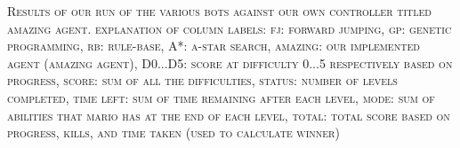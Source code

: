 \documentclass[12pt]{article}
\begin{document}
\begin{center}
\begin{table}[h]
\caption*{\footnotesize Controller Scores}
\end{table}

\vspace{-3ex}
\textsc{\scriptsize Results of our run of the various bots against our own controller titled amazing agent. explanation 
of column labels: fj: forward jumping, gp: genetic programming, rb: rule-base, A*: a-star search, amazing: our 
implemented agent (amazing agent), D0...D5: score at difficulty 0...5 respectively based on progress, score: sum of 
all the difficulties, status: number of levels completed, time left: sum of time remaining after each level, mode: sum of 
abilities that mario has at the end of each level, total: total score based on progress, kills, and time taken (used to 
calculate winner)}
\end{center}
\end{document}
